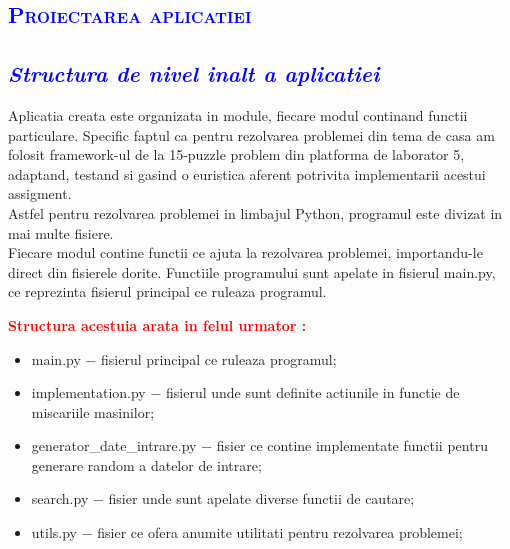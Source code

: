 \documentclass{article}
\begin{document}
\newpage   
\begin{center}
     \textcolor{blue}{\section{\bfseries\scshape\textcolor{blue}{Proiectarea aplicatiei}}}
\end{center}
\vspace{7mm}
 \textcolor{blue}{\subsection{\itshape \textcolor{blue}{Structura de nivel inalt a aplicatiei }}}
\vspace{10mm}
\begin{flushleft}
\quad Aplicatia creata este organizata in module, fiecare modul continand functii particulare. Specific faptul ca pentru rezolvarea problemei din tema de casa am folosit framework-ul de la 15-puzzle problem din platforma de laborator 5, adaptand, testand si gasind o euristica aferent potrivita implementarii acestui assigment.\\
\vspace{2mm}
Astfel pentru rezolvarea problemei in limbajul Python, programul este divizat in mai multe fisiere.\\
Fiecare modul contine functii ce ajuta la rezolvarea problemei, importandu-le direct din fisierele dorite.  
Functiile programului sunt apelate in fisierul main.py, ce reprezinta fisierul principal ce ruleaza programul.\par 
\vspace{3mm}
\quad \textcolor{red}{\bfseries Structura acestuia arata in felul urmator :} \par
\end{flushleft}

\begin{itemize}
  \item  main.py $-$ fisierul principal ce ruleaza programul;
  \item implementation.py $-$ fisierul unde sunt definite actiunile in functie de  miscariile masinilor;
  \item generator\_date\_intrare.py $-$ fisier ce contine implementate functii pentru generare random a datelor de intrare;
  \item search.py $-$ fisier unde sunt apelate diverse functii de cautare;
  \item utils.py $-$ fisier ce ofera anumite utilitati pentru rezolvarea problemei;
\end{itemize}
\vspace{2mm}
\end{document}
